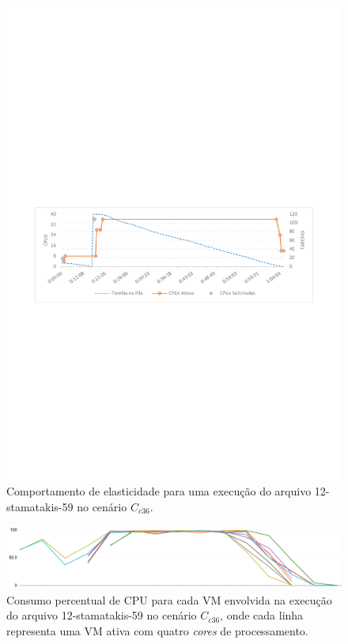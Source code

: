 \documentclass[english,brazilian]{UNISINOSmonografia} %
\begin{document}
\begin{figure}[p]
	\centering%
	\begin{minipage}{\textwidth}
		\caption{Comportamento de elasticidade para uma execução do arquivo 12-stamatakis-59 no cenário $C_{c36}$.}
		\label{fig:results-modelo-batch-stamatakis}
		\vspace{1ex}
		\includegraphics[trim=60 325 60 360,clip,width=\textwidth]{stamatakis_36cpu}
	\end{minipage}
\end{figure}
\begin{figure}[p]
	\centering%
	\begin{minipage}{\textwidth}
		\caption{Consumo percentual de CPU para cada VM envolvida na execução do arquivo 12-stamatakis-59 no cenário $C_{c36}$, onde cada linha representa uma VM ativa com quatro \textit{cores} de processamento.}		
		\label{fig:results-modelo-batch-stamatakis-detail}
		\vspace{1ex}
		\includegraphics[width=\textwidth]{stamatakis_36cpu_processors}
	\end{minipage}
\end{figure}
\end{document}

